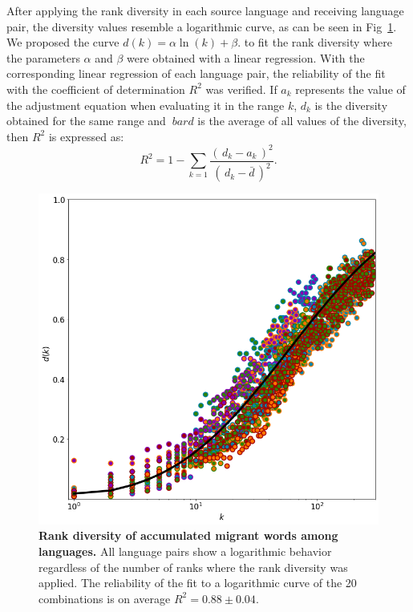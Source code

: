 \documentclass[10pt,letterpaper]{article} %
\begin{document}
After applying the rank diversity in each source language and receiving language pair, the diversity values resemble a logarithmic curve, as can be seen in Fig~\ref{fig.DR_art}. We proposed the curve $d(k) =  \alpha \ln(k) + \beta.$ to fit the rank diversity where the parameters $\alpha$ and $\beta$ were obtained with a linear regression. With the corresponding linear regression of each language pair, the reliability of the fit with the coefficient of determination $R^{2}$ was verified. If $ a_ {k} $ represents the value of the adjustment equation when evaluating it in the range $ k $, $ d_ {k} $ is the diversity obtained for the same range and $ \ bar {d} $ is the average of all values of the diversity, then $R^{2}$ is expressed as:
\begin{equation}
R^{2} = 1 - \sum_{k = 1} \frac{ \left( \,d_{k} - a_{k} \,\right)^{2}  }{ \left( \, d_{k} - \bar{d} \,\right)^{2} }.	
\label{ec.r2_diversidad}
\end{equation}

\begin{figure}[!h]
	\begin{adjustwidth}{-2.5cm}{1cm}
		\centering
		\includegraphics[scale=.38]{DR_art.png}
		\caption{{\bf Rank diversity of accumulated migrant words among languages.} All language pairs show a logarithmic behavior regardless of the number of ranks where the rank diversity was applied. The reliability of the fit to a logarithmic curve of the 20 combinations is on average $R^{2}= 0.88 \pm 0.04$.}
		\label{fig.DR_art}
	\end{adjustwidth}
\end{figure}
\end{document}
